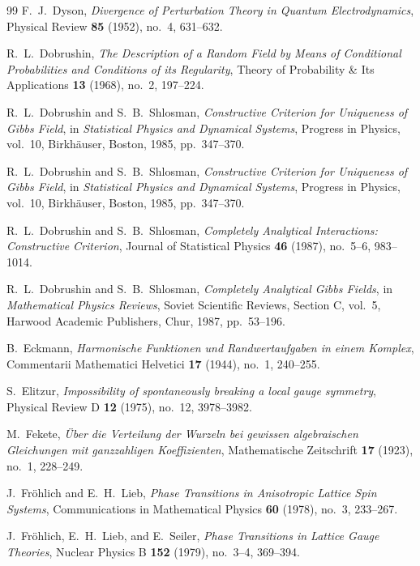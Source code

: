 \begin{thebibliography}{99}
F.~J.~Dyson,
\textit{Divergence of Perturbation Theory in Quantum Electrodynamics},
Physical Review \textbf{85} (1952), no.~4, 631--632.

R.~L.~Dobrushin,
\textit{The Description of a Random Field by Means of Conditional Probabilities and Conditions of its Regularity},
Theory of Probability \& Its Applications \textbf{13} (1968), no.~2, 197--224.

R.~L.~Dobrushin and S.~B.~Shlosman,
\textit{Constructive Criterion for Uniqueness of Gibbs Field},
in \textit{Statistical Physics and Dynamical Systems}, Progress in Physics, vol.~10, Birkh{\"a}user, Boston, 1985, pp.~347--370.

R.~L.~Dobrushin and S.~B.~Shlosman,
\textit{Constructive Criterion for Uniqueness of Gibbs Field},
in \textit{Statistical Physics and Dynamical Systems}, Progress in Physics, vol.~10, Birkh{\"a}user, Boston, 1985, pp.~347--370.

R.~L.~Dobrushin and S.~B.~Shlosman,
\textit{Completely Analytical Interactions: Constructive Criterion},
Journal of Statistical Physics \textbf{46} (1987), no.~5--6, 983--1014.

R.~L.~Dobrushin and S.~B.~Shlosman,
\textit{Completely Analytical Gibbs Fields},
in \textit{Mathematical Physics Reviews}, Soviet Scientific Reviews, Section C, vol.~5, Harwood Academic Publishers, Chur, 1987, pp.~53--196.

B.~Eckmann,
\textit{Harmonische Funktionen und Randwertaufgaben in einem Komplex},
Commentarii Mathematici Helvetici \textbf{17} (1944), no.~1, 240--255.

S.~Elitzur,
\textit{Impossibility of spontaneously breaking a local gauge symmetry},
Physical Review D \textbf{12} (1975), no.~12, 3978--3982.

M.~Fekete,
\textit{{\"U}ber die Verteilung der Wurzeln bei gewissen algebraischen Gleichungen mit ganzzahligen Koeffizienten},
Mathematische Zeitschrift \textbf{17} (1923), no.~1, 228--249.

J.~Fr{\"o}hlich and E.~H.~Lieb,
\textit{Phase Transitions in Anisotropic Lattice Spin Systems},
Communications in Mathematical Physics \textbf{60} (1978), no.~3, 233--267.

J.~Fr{\"o}hlich, E.~H.~Lieb, and E.~Seiler,
\textit{Phase Transitions in Lattice Gauge Theories},
Nuclear Physics B \textbf{152} (1979), no.~3--4, 369--394.


\end{thebibliography}
